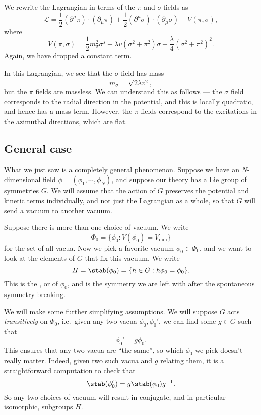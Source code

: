 \documentclass[a4paper]{article}
\begin{document}
We rewrite the Lagrangian in terms of the $\pi$ and $\sigma$ fields as
\[
  \mathcal{L} = \frac{1}{2}(\partial^\mu \pi) \cdot (\partial_\mu \pi) + \frac{1}{2}(\partial^\mu \sigma) \cdot (\partial_\mu \sigma) - V(\pi, \sigma),
\]
where
\[
  V(\pi, \sigma) = \frac{1}{2} m_\sigma^2 \sigma^s + \lambda v(\sigma^2 + \pi^2) \sigma + \frac{\lambda}{4}(\sigma^2 + \pi^2)^2.
\]
Again, we have dropped a constant term.

In this Lagrangian, we see that the $\sigma$ field has mass
\[
  m_\sigma = \sqrt{2\lambda v^2},
\]
but the $\pi$ fields are massless. We can understand this as follows --- the $\sigma$ field corresponds to the radial direction in the potential, and this is locally quadratic, and hence has a mass term. However, the $\pi$ fields correspond to the excitations in the azimuthal directions, which are flat.

\subsection{General case}
What we just saw is a completely general phenomenon. Suppose we have an $N$-dimensional field $\phi = (\phi_1, \cdots, \phi_N)$, and suppose our theory has a Lie group of symmetries $G$. We will assume that the action of $G$ preserves the potential and kinetic terms individually, and not just the Lagrangian as a whole, so that $G$ will send a vacuum to another vacuum.

Suppose there is more than one choice of vacuum. We write
\[
  \Phi_0 = \{\phi_0: V(\phi_0) = V_{\mathrm{min}}\}
\]
for the set of all vacua. Now we pick a favorite vacuum $\phi_0 \in \Phi_0$, and we want to look at the elements of $G$ that fix this vacuum. We write
\[
  H = \stab(\phi_0) = \{h \in G: h \phi_0 = \phi_0\}.
\]
This is the , or  of $\phi_0$, and is the symmetry we are left with after the spontaneous symmetry breaking.

We will make some further simplifying assumptions. We will suppose $G$ acts \emph{transitively} on $\Phi_0$, i.e.\ given any two vacua $\phi_0, \phi_0'$, we can find some $g \in G$ such that
\[
  \phi_0' = g \phi_0.
\]
This ensures that any two vacua are ``the same'', so which $\phi_0$ we pick doesn't really matter. Indeed, given two such vacua and $g$ relating them, it is a straightforward computation to check that
\[
  \stab(\phi_0') = g \stab(\phi_0) g^{-1}.
\]
So any two choices of vacuum will result in conjugate, and in particular isomorphic, subgroups $H$.
\end{document}
